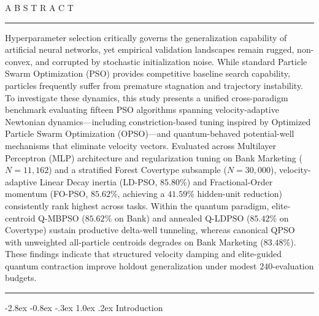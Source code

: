 \documentclass[10pt]{article}
\makeatletter
\renewcommand\section{\@startsection {section}{1}{\z@}%
                                   {-2.8ex \@plus -0.8ex \@minus -.3ex}%
                                   {1.0ex \@plus .2ex}%
                                   {\normalfont\bfseries\fontsize{8.5pt}{11.0pt}\selectfont}}
\makeatother
\begin{document}
\begin{minipage}[t]{0.70\textwidth}
{\fontsize{7.0pt}{9.0pt}\selectfont A B S T R A C T}\par\vspace{2pt}
\rule{\linewidth}{0.4pt}\par\vspace{5pt}
{\fontsize{7.2pt}{9.6pt}\selectfont
Hyperparameter selection critically governs the generalization capability of artificial neural networks, yet empirical validation landscapes remain rugged, non-convex, and corrupted by stochastic initialization noise. While standard Particle Swarm Optimization (PSO) provides competitive baseline search capability, particles frequently suffer from premature stagnation and trajectory instability. To investigate these dynamics, this study presents a unified cross-paradigm benchmark evaluating fifteen PSO algorithms spanning velocity-adaptive Newtonian dynamics---including constriction-based tuning inspired by Optimized Particle Swarm Optimization (OPSO)---and quantum-behaved potential-well mechanisms that eliminate velocity vectors. Evaluated across Multilayer Perceptron (MLP) architecture and regularization tuning on Bank Marketing ($N=11{,}162$) and a stratified Forest Covertype subsample ($N=30{,}000$), velocity-adaptive Linear Decay inertia (LD-PSO, $85.80\%$) and Fractional-Order momentum (FO-PSO, $85.62\%$, achieving a $41.59\%$ hidden-unit reduction) consistently rank highest across tasks. Within the quantum paradigm, elite-centroid Q-MBPSO ($85.62\%$ on Bank) and annealed Q-LDPSO ($85.42\%$ on Covertype) sustain productive delta-well tunneling, whereas canonical QPSO with unweighted all-particle centroids degrades on Bank Marketing ($83.48\%$). These findings indicate that structured velocity damping and elite-guided quantum contraction improve holdout generalization under modest $240$-evaluation budgets.\par}
\end{minipage}\par\vspace{4pt}
\noindent\rule{\textwidth}{0.4pt}\par\vspace{10pt}







\section{Introduction}
\end{document}
